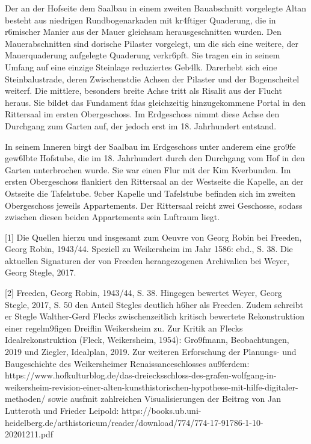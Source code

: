 \documentclass[
  letterpaper,
]{book}
\begin{document}
Der an der Hofseite dem Saalbau in einem zweiten Bauabschnitt vorgelegte
Altan besteht aus niedrigen Rundbogenarkaden mit kr\xa4ftiger
Quaderung, die in r\xb6mischer Manier aus der Mauer gleichsam
herausgeschnitten wurden. Den Mauerabschnitten sind dorische Pilaster
vorgelegt, um die sich eine weitere, der Mauerquaderung aufgelegte
Quaderung verkr\xb6pft. Sie tragen ein in seinem Umfang auf eine
einzige Steinlage reduziertes Geb\xa4lk. Dar\xbcber erhebt sich
eine Steinbalustrade, deren Zwischenst\xbctzen die Achsen der
Pilaster und der Bogenscheitel weiterf\xbchren. Die mittlere,
besonders breite Achse tritt als Risalit aus der Flucht heraus. Sie
bildet das Fundament f\xbcr das gleichzeitig hinzugekommene Portal
in den Rittersaal im ersten Obergeschoss. Im Erdgeschoss nimmt diese
Achse den Durchgang zum Garten auf, der jedoch erst im 18. Jahrhundert
entstand.

In seinem Inneren birgt der Saalbau im Erdgeschoss unter anderem eine
gro\x9fe gew\xb6lbte Hofstube, die im 18. Jahrhundert durch den
Durchgang vom Hof in den Garten unterbrochen wurde. Sie war
\xbcber einen Flur mit der K\xbcche im
K\xbcchenbau verbunden. Im ersten Obergeschoss flankiert den
Rittersaal an der Westseite die Kapelle, an der Ostseite die Tafelstube.
\x9cber Kapelle und Tafelstube befinden sich im zweiten Obergeschoss
jeweils Appartements. Der Rittersaal reicht \xbcber zwei Geschosse,
sodass zwischen diesen beiden Appartements sein Luftraum liegt.

{[}1{]} Die Quellen hierzu und insgesamt zum Oeuvre von Georg Robin bei
Freeden, Georg Robin, 1943/44. Speziell zu Weikersheim im Jahr 1586:
ebd., S. 38. Die aktuellen Signaturen der von Freeden herangezogenen
Archivalien bei Weyer, Georg Stegle, 2017.

{[}2{]} Freeden, Georg Robin, 1943/44, S. 38. Hingegen bewertet Weyer,
Georg Stegle, 2017, S. 50 den Anteil Stegles deutlich h\xb6her als
Freeden. Zudem schreibt er Stegle Walther-Gerd Flecks zwischenzeitlich
kritisch bewertete Rekonstruktion einer regelm\x9figen
Dreifl\xbcgelanlage in Weikersheim zu. Zur Kritik an Flecks
Idealrekonstruktion (Fleck, Weikersheim, 1954): Gro\x9fmann,
Beobachtungen, 2019 und Ziegler, Idealplan, 2019. Zur weiteren
Erforschung der Planungs- und Baugeschichte des Weikersheimer
Renaissanceschlosses au\x9ferdem:
https://www.hofkulturblog.de/das-dreiecksschloss-des-grafen-wolfgang-in-weikersheim-revision-einer-alten-kunsthistorischen-hypothese-mit-hilfe-digitaler-methoden/
sowie ausf\xbchrlich mit zahlreichen Visualisierungen der Beitrag
von Jan Lutteroth und Frieder Leipold:
https://books.ub.uni-heidelberg.de/arthistoricum/reader/download/774/774-17-91786-1-10-20201211.pdf
\end{document}
